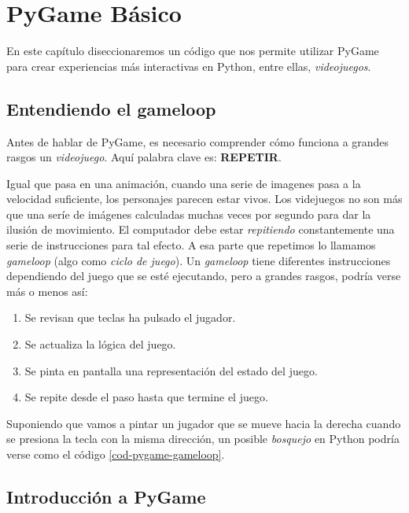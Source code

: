 \chapter{PyGame Básico}
\label{chap:pygame}

En este capítulo diseccionaremos un código que nos permite utilizar PyGame para crear experiencias más interactivas en Python, entre ellas, \emph{videojuegos}.

\section{Entendiendo el gameloop}

Antes de hablar de PyGame, es necesario comprender cómo funciona a grandes rasgos un \emph{videojuego}. Aquí palabra clave es: \textbf{REPETIR}.

Igual que pasa en una animación, cuando una serie de imagenes pasa a la velocidad suficiente, los personajes parecen estar vivos. Los videjuegos no son más que una seríe de imágenes calculadas muchas veces por segundo para dar la ilusión de movimiento. El computador debe estar \emph{repitiendo} constantemente una serie de instrucciones para tal efecto. A esa parte que repetimos lo llamamos \emph{gameloop} (algo como \emph{ciclo de juego}). Un \emph{gameloop} tiene diferentes instrucciones dependiendo del juego que se esté ejecutando, pero a grandes rasgos, podría verse más o menos así:

\begin{enumerate}
\item Se revisan que teclas ha pulsado el jugador.
\item Se actualiza la lógica del juego.
\item Se pinta en pantalla una representación del estado del juego.
\item Se repite desde el paso hasta que termine el juego.
\end{enumerate}

\newpage

Suponiendo que vamos a pintar un jugador que se mueve hacia la derecha cuando se presiona la tecla con la misma dirección, un posible \emph{bosquejo} en Python podría verse como el código \ref{cod-pygame-gameloop}. 





\section{Introducción a PyGame}

